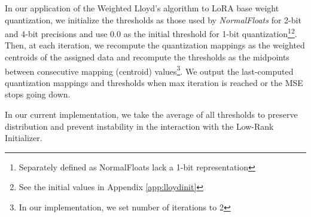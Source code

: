 In our application of the Weighted Lloyd's algorithm to LoRA base weight quantization, we initialize the thresholds as those used by \textit{NormalFloats} \cite{dettmers2024qlora} for 2-bit and 4-bit precisions and use $0.0$ as the initial threshold for 1-bit quantization\footnote{Separately defined as NormalFloats lack a 1-bit representation}\footnote{See the initial values in Appendix \ref{app:lloydinit} }. Then, at each iteration, we recompute the quantization mappings as the weighted centroids of the assigned data and recompute the thresholds as the midpoints between consecutive mapping (centroid) values\footnote{In our implementation, we set number of iterations to 2}. We output the last-computed quantization mappings and thresholds when max iteration is reached or the MSE stops going down.







In our current implementation, we take the average of all thresholds to preserve distribution and prevent instability in the interaction with the Low-Rank Initializer.